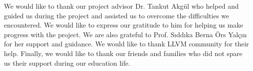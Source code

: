\vspace*{-6pt}
We would like to thank our project advisor Dr. Tankut Akgül who helped and guided us during the project and assisted us to overcome the difficulties we encountered. We would like to express our gratitude to him for helping us make progress with the project. We are also grateful to Prof. Sıddıka Berna Örs Yalçın for her support and guidance. We would like to thank LLVM community for their help. Finally, we would like to thank our friends and families who did not spare us their support during our education life.




